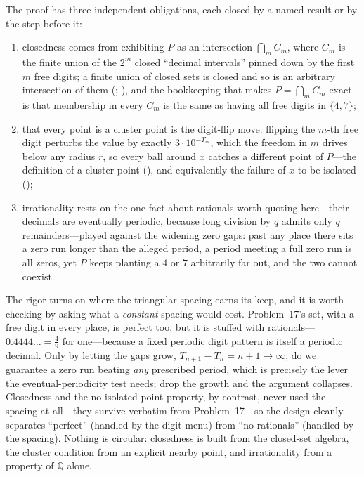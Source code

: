 \documentclass[main.tex]{subfiles}
\begin{document}
\begin{Reflection}
The proof has three independent obligations, each closed by a named result or by the step before it:
\begin{enumerate}[leftmargin=1.7em,itemsep=3pt,topsep=2pt,label=\textnormal{(\arabic*)}]
  \item closedness comes from exhibiting $P$ as an intersection $\bigcap_m C_m$, where $C_m$ is the finite
        union of the $2^m$ closed ``decimal intervals'' pinned down by the first $m$ free digits; a finite
        union of closed sets is closed and so is an arbitrary intersection of them
        (; ), and the
        bookkeeping that makes $P=\bigcap_m C_m$ exact is that membership in every $C_m$ is the same as
        having all free digits in $\{4,7\}$;
  \item that every point is a cluster point is the digit-flip move: flipping the $m$-th free digit perturbs
        the value by exactly $3\cdot 10^{-T_m}$, which the freedom in $m$ drives below any radius $r$, so
        every ball around $x$ catches a different point of $P$---the definition of a cluster point
        (), and equivalently the failure of $x$ to be isolated ();
  \item irrationality rests on the one fact about rationals worth quoting here---their decimals are
        eventually periodic, because long division by $q$ admits only $q$ remainders---played against the
        widening zero gaps: past any place there sits a zero run longer than the alleged period, a period
        meeting a full zero run is all zeros, yet $P$ keeps planting a $4$ or $7$ arbitrarily far out, and
        the two cannot coexist.
\end{enumerate}

The rigor turns on where the triangular spacing earns its keep, and it is worth checking by asking what a
\emph{constant} spacing would cost. Problem~17's set, with a free digit in every place, is perfect too, but
it is stuffed with rationals---$0.4444\dots=\tfrac49$ for one---because a fixed periodic digit pattern is
itself a periodic decimal. Only by letting the gaps grow, $T_{n+1}-T_n=n+1\to\infty$, do we guarantee a
zero run beating \emph{any} prescribed period, which is precisely the lever the eventual-periodicity test
needs; drop the growth and the argument collapses. Closedness and the no-isolated-point property, by
contrast, never used the spacing at all---they survive verbatim from Problem~17---so the design cleanly
separates ``perfect'' (handled by the digit menu) from ``no rationals'' (handled by the spacing). Nothing
is circular: closedness is built from the closed-set algebra, the cluster condition from an explicit
nearby point, and irrationality from a property of $\mathbb Q$ alone.


\end{Reflection}
\end{document}
